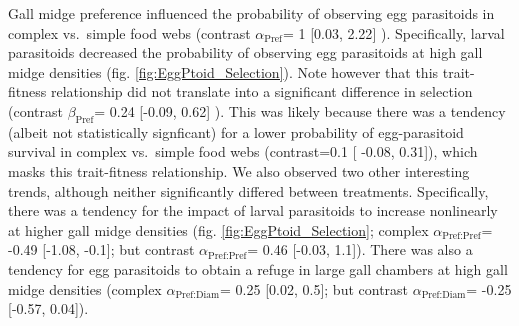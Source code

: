 \documentclass[11pt,]{article}
\begin{document}
Gall midge preference influenced the probability of observing egg
parasitoids in complex vs.~simple food webs (contrast
\(\alpha_{\text{Pref}}\)= 1 {[}0.03, 2.22{]} ). Specifically, larval
parasitoids decreased the probability of observing egg parasitoids at
high gall midge densities (fig. \ref{fig:EggPtoid_Selection}). Note
however that this trait-fitness relationship did not translate into a
significant difference in selection (contrast \(\beta_{\text{Pref}}\)=
0.24 {[}-0.09, 0.62{]} ). This was likely because there was a tendency
(albeit not statistically signficant) for a lower probability of
egg-parasitoid survival in complex vs.~simple food webs (contrast=0.1
{[} -0.08, 0.31{]}), which masks this trait-fitness relationship. We
also observed two other interesting trends, although neither
significantly differed between treatments. Specifically, there was a
tendency for the impact of larval parasitoids to increase nonlinearly at
higher gall midge densities (fig. \ref{fig:EggPtoid_Selection}; complex
\(\alpha_{\text{Pref:Pref}}\)= -0.49 {[}-1.08, -0.1{]}; but contrast
\(\alpha_{\text{Pref:Pref}}\)= 0.46 {[}-0.03, 1.1{]}). There was also a
tendency for egg parasitoids to obtain a refuge in large gall chambers
at high gall midge densities (complex \(\alpha_{\text{Pref:Diam}}\)=
0.25 {[}0.02, 0.5{]}; but contrast \(\alpha_{\text{Pref:Diam}}\)= -0.25
{[}-0.57, 0.04{]}).
\end{document}
